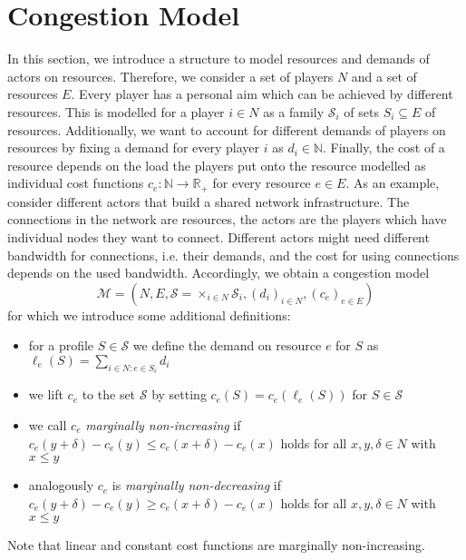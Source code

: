 \documentclass{scrartcl}
\theoremstyle{nonumberplain}
\newcommand{\tupel}[1]{\left(#1\right)}
\begin{document}
\section{Congestion Model}
In this section, we introduce a structure to model resources and demands
of actors on resources. Therefore, we consider a set of players $N$ and a set
of resources $E$. Every player has a personal aim which can be achieved by
different resources. This is modelled for a player $i\in N$ as a family
$\mathcal{S}_{i}$ of sets $S_{i}\subseteq E$ of resources. Additionally, we
want to account for different demands of players on resources by fixing a
demand for every player $i$ as $d_{i}\in\mathbb{N}$. Finally, the cost of a
resource depends on the load the players put onto the resource modelled as
individual cost functions $c_{e}:\mathbb{N}\rightarrow \mathbb{R}_{+}$ for
every resource $e\in E$. As an example, consider different actors that build a
shared network infrastructure. The connections in the network are resources,
the actors are the players which have individual nodes they want to connect.
Different actors might need different bandwidth for connections, i.e. their
demands, and the cost for using connections depends on the used bandwidth.
Accordingly, we obtain a congestion model
\begin{equation*}
  \mathcal{M} = \tupel{N, E, \mathcal{S} = \times_{i\in N}\mathcal{S}_{i},
  (d_{i})_{i\in N}, (c_{e})_{e\in E}}
\end{equation*}
for which we introduce some additional definitions:
\begin{itemize}
  \item for a profile $S\in\mathcal{S}$ we define
    the demand on resource $e$ for $S$ as
    $\ell_{e}(S) = \sum_{i\in N:e\in S_{i}}d_{i}$
  \item we lift $c_{e}$ to the set $\mathcal{S}$ by setting
    $c_{e}(S) = c_{e}(\ell_{e}(S))$ for $S\in\mathcal{S}$
  \item we call $c_{e}$ \emph{marginally non-increasing} if
    $c_{e}(y + \delta) - c_{e}(y) \leq c_{e}(x + \delta) - c_{e}(x)$ holds
    for all $x,y,\delta\in N$ with $x\leq y$
  \item analogously $c_{e}$ is \emph{marginally non-decreasing} if
    $c_{e}(y + \delta) - c_{e}(y) \geq c_{e}(x + \delta) - c_{e}(x)$ holds
    for all $x,y,\delta\in N$ with $x\leq y$
\end{itemize}
Note that linear and constant cost functions are marginally non-increasing.
\end{document}

